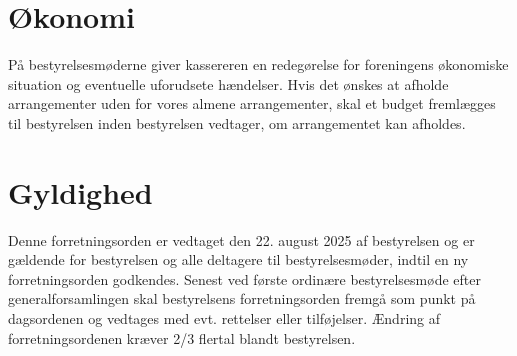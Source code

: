 \section{Økonomi}
På bestyrelsesmøderne giver kassereren en redegørelse for foreningens økonomiske situation og eventuelle 
uforudsete hændelser. Hvis det ønskes at afholde arrangementer uden for vores almene arrangementer, skal et 
budget fremlægges til bestyrelsen inden bestyrelsen vedtager, om arrangementet kan afholdes.

\section{Gyldighed}
Denne forretningsorden er vedtaget den 22. august 2025 af bestyrelsen og er gældende for bestyrelsen og 
alle deltagere til bestyrelsesmøder, indtil en ny forretningsorden godkendes. Senest ved første ordinære 
bestyrelsesmøde efter generalforsamlingen skal bestyrelsens forretningsorden fremgå som punkt på dagsordenen 
og vedtages med evt. rettelser eller tilføjelser. Ændring af forretningsordenen kræver 2/3 flertal blandt 
bestyrelsen.


